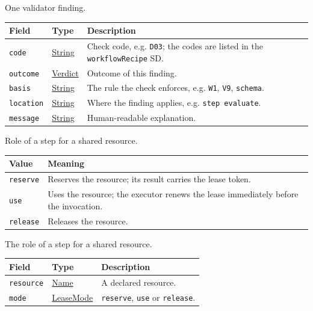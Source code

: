 \documentclass[a4paper]{arrowhead}
\newcommand{\mref}[1]{{\textcolor{ArrowheadPurple}{\hyperref[sec:model:#1]{#1}}}}
\newcommand{\pref}[1]{{\textcolor{ArrowheadGrey}{\hyperref[sec:model:primitives:#1]{#1}}}}
\begin{document}
One validator finding.

{\small
\begin{longtable}{|p{3.9cm}|p{4.4cm}|p{7.5cm}|}

\hline
\rowcolor{gray!33} Field & Type & Description \\ \hline
\endhead
\texttt{code} & \pref{String} & Check code, e.g. \texttt{D03}; the codes are listed in the \texttt{workflow\allowbreak{}Recipe} SD. \\ \hline
\texttt{outcome} & \mref{Verdict} & Outcome of this finding. \\ \hline
\texttt{basis} & \pref{String} & The rule the check enforces, e.g. \texttt{W1}, \texttt{V9}, \texttt{schema}. \\ \hline
\texttt{location} & \pref{String} & Where the finding applies, e.g. \texttt{step evaluate}. \\ \hline
\texttt{message} & \pref{String} & Human-readable explanation. \\ \hline
\end{longtable}
}

Role of a step for a shared resource.

{\small
\begin{longtable}{|p{3.9cm}|p{11.9cm}|}

\hline
\rowcolor{gray!33} Value & Meaning \\ \hline
\endhead
\texttt{reserve} & Reserves the resource; its result carries the lease token. \\ \hline
\texttt{use} & Uses the resource; the executor renews the lease immediately before the invocation. \\ \hline
\texttt{release} & Releases the resource. \\ \hline
\end{longtable}
}

The role of a step for a shared resource.

{\small
\begin{longtable}{|p{3.9cm}|p{4.4cm}|p{7.5cm}|}

\hline
\rowcolor{gray!33} Field & Type & Description \\ \hline
\endhead
\texttt{resource} & \pref{Name} & A declared resource. \\ \hline
\texttt{mode} & \mref{LeaseMode} & \texttt{reserve}, \texttt{use} or \texttt{release}. \\ \hline
\end{longtable}
}
\end{document}
